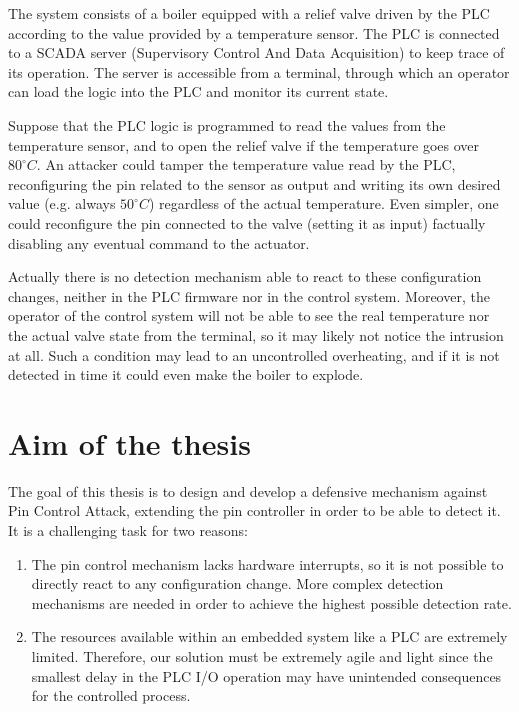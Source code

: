 The system consists of a boiler equipped with a relief valve driven by the PLC according to the value provided by a temperature sensor.
The PLC is connected to a SCADA server (Supervisory Control And Data Acquisition) to keep trace of its operation.
The server is accessible from a terminal, through which an operator can load the logic into the PLC and monitor its current state.

Suppose that the PLC logic is programmed to read the values from the temperature sensor, and to open the relief valve if the temperature goes over $80^\circ C$.
An attacker could tamper the temperature value read by the PLC, reconfiguring the pin related to the sensor as output and writing its own desired value
(e.g. always $50^\circ C$) regardless of the actual temperature.
Even simpler, one could reconfigure the pin connected to the valve (\eg setting it as input) factually disabling any eventual command to the actuator.

Actually there is no detection mechanism able to react to these configuration changes, neither in the PLC firmware nor in the control system.
Moreover, the operator of the control system will not be able to see the real temperature nor the actual valve state from the terminal,
so it may likely not notice the intrusion at all.
Such a condition may lead to an uncontrolled overheating, and if it is not detected in time it could even make the boiler to explode.


\section{Aim of the thesis}

The goal of this thesis is to design and develop a defensive mechanism against Pin Control Attack, extending the pin controller in order to be able to detect it.
It is a challenging task for two reasons:
\begin{enumerate}
	\item The pin control mechanism lacks hardware interrupts, so it is not possible to directly react to any configuration change. More complex detection mechanisms are needed
		in order to achieve the highest possible detection rate.
	\item The resources available within an embedded system like a PLC are extremely limited. Therefore, our solution must be extremely agile and light
		since the smallest delay in the PLC I/O operation may have unintended consequences for the controlled process.
\end{enumerate}

